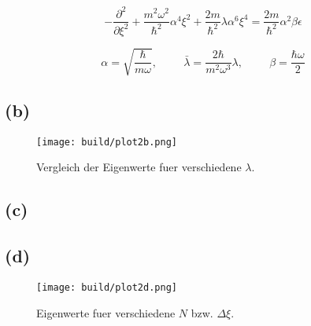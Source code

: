 \documentclass{scrartcl}
\begin{document}
\begin{equation}
		- \frac{\partial^2}{\partial \xi^2} + \frac{m^2
		\omega^2}{\hbar^2} \alpha^4 \xi^2 + \frac{2m}{\hbar^2} \lambda \alpha^6
		\xi^4 = \frac{2m}{\hbar^2} \alpha^2 \beta \epsilon
\end{equation}

\begin{equation}
		\alpha = \sqrt{\frac{\hbar}{m \omega}}, \hspace{1cm} \bar{\lambda} =
		\frac{2 \hbar}{m^2 \omega^3} \lambda, \hspace{1cm} \beta = \frac{\hbar
		\omega}{2}
\end{equation}
\subsection*{(b)}
\begin{figure}[ht]
  \centering
  \texttt{[image: build/plot2b.png]}
  \caption{Vergleich der Eigenwerte fuer verschiedene $\lambda$.}%
  \label{fig:2b}
\end{figure}

\subsection*{(c)}

\subsection*{(d)}
\begin{figure}[ht]
  \centering
  \texttt{[image: build/plot2d.png]}
  \caption{Eigenwerte fuer verschiedene $N$ bzw. $\Delta \xi$.}%
  \label{fig:2d}
\end{figure}
\end{document}

